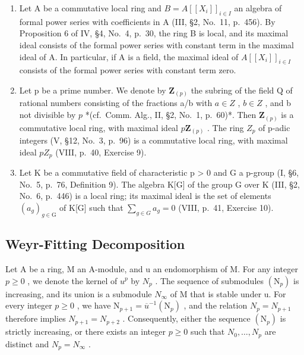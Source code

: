 \begin{enumerate}
\def\labelenumi{\arabic{enumi})}
\setcounter{enumi}{3}
\item
  Let A be a commutative local ring and \(B = A[[X_{i}]]_{i \in I}\) an algebra of formal power series with coefficients in A (III, §2, No.~11, p.~456). By Proposition 6 of IV, §4, No.~4, p.~30, the ring B is local, and its maximal ideal consists of the formal power series with constant term in the maximal ideal of A. In particular, if A is a field, the maximal ideal of \(A[[X_{i}]]_{i \in I}\) consists of the formal power series with constant term zero.
\item
  Let p be a prime number. We denote by \(\mathbf{Z}_{(p)}\) the subring of the field Q of rational numbers consisting of the fractions a/b with \(a \in Z\) , \(b \in Z\) , and b not divisible by \(p\) *(cf.~Comm. Alg., II, §2, No.~1, p.~60)*. Then \(\mathbf{Z}_{(p)}\) is a commutative local ring, with maximal ideal \(p\mathbf{Z}_{(p)}\) . The ring \(Z_{p}\) of p-adic integers (V, §12, No.~3, p.~96) is a commutative local ring, with maximal ideal \(pZ_{p}\) (VIII, p.~40, Exercise 9).
\item
  Let K be a commutative field of characteristic p \textgreater{} 0 and G a p-group (I, §6, No.~5, p.~76, Definition 9). The algebra K{[}G{]} of the group G over K (III, §2, No.~6, p.~446) is a local ring; its maximal ideal is the set of elements \((a_{g})_{g \in \mathrm{G}}\) of K{[}G{]} such that \(\sum_{g \in G} a_{g} = 0\) (VIII, p.~41, Exercise 10).
\end{enumerate}

\subsection{Weyr-Fitting Decomposition}

Let A be a ring, M an A-module, and u an endomorphism of M. For any integer \(p \geqslant 0\) , we denote the kernel of \(u^{p}\) by \(N_{p}\) . The sequence of submodules \((\mathrm{N}_{p})\) is increasing, and its union is a submodule \(N_{\infty}\) of M that is stable under u. For every integer \(p \geqslant 0\) , we have \(\mathrm{N}_{p+1} = \overline{u}^{-1}(\mathrm{N}_{p})\) , and the relation \(N_{p} = N_{p+1}\) therefore implies \(N_{p+1} = N_{p+2}\) . Consequently, either the sequence \((\mathrm{N}_{p})\) is strictly increasing, or there exists an integer \(p \geqslant 0\) such that \(N_{0}, \ldots, N_{p}\) are distinct and \(N_{p} = N_{\infty}\) .

